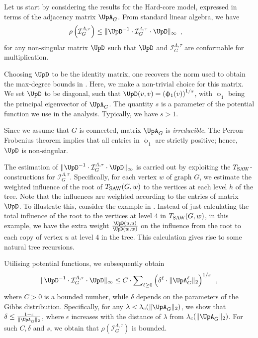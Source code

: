 \documentclass[11pt,reqno]{amsart}
\numberwithin{equation}{section}
\newcommand{\cI}{{\mathcal{I}}}
\newcommand{\applegreen}[1]{ {\color{applegreen}#1}}
\newcommand{\blue}[1]{{\color{blue}#1}}
\newcommand{\cadmiumorange}[1]{{\color{cadmiumorange}#1}}
\newcommand{\darkmagenta}[1]{{\color{darkmagenta}#1}}
\newcommand{\electricviolet}[1]{{\color{electricviolet}#1}}
\newcommand{\goldenbrown}[1]{{\color{goldenbrown}#1}}
\newcommand{\red}[1]{{\color{red}#1}}
\newcommand{\lcritical}{{\lambda_c}}
\newcommand{\pfs}{\darkmagenta{s}}
\newcommand{\Tsaw}{T_{\rm SAW}}
\newcommand{\infmatrix}{\cI}
\newcommand{\spradius}{{\rho}}
\newcommand{\norm}[2]{\goldenbrown{\|} #1 \goldenbrown{\|}_{#2}}
\newcommand{\Adjacency}{{\UpA}}
\newcommand{\eigenv}{\upphi}
\renewcommand{\applegreen}[1]{#1}
\renewcommand{\blue}[1]{#1}
\renewcommand{\cadmiumorange}[1]{#1}
\renewcommand{\darkmagenta}[1]{#1}
\renewcommand{\electricviolet}[1]{#1}
\renewcommand{\goldenbrown}[1]{#1}
\renewcommand{\red}[1]{#1}
\newcommand{\kh}{\cadmiumorange{h}}
\newcommand{\kell}{{\color{green(pigment)}\ell}}%
\newcommand{\ku}{\red{u}}
\newcommand{\kv}{\electricviolet{v}}
\newcommand{\kw}{\blue{w}}
\renewcommand{\kh}{h}
\renewcommand{\kell}{\ell}
\renewcommand{\ku}{u}
\renewcommand{\kv}{v}
\renewcommand{\kw}{w}
\begin{document}
Let us start by considering  the results for the Hard-core model,  expressed in terms of the adjacency matrix $\Adjacency_G$.  
From  standard  linear algebra, we have 
\begin{align*}
\spradius\left( \infmatrix^{\Lambda,\tau}_{G} \right) &\leq \norm{ \UpD^{-1} \cdot \infmatrix^{\Lambda,\tau}_{G} \cdot \UpD }{\infty} \enspace,
\end{align*}
for any non-singular matrix $\UpD$ such that $\UpD$ and $\infmatrix^{\Lambda,\tau}_{G}$ are conformable 
for multiplication. 



Choosing $\UpD$ to be the identity matrix, one recovers the  norm used to obtain the max-degree 
bounds in  \cite{VigodaSpectralInd}. Here, we make a non-trivial choice for this matrix. We set $\UpD$ 
to be diagonal, such that $\UpD(\kv,\kv)=\left( \eigenv_1(\kv)\right)^{1/\pfs}$,  with $\eigenv_1$ being the 
principal eigenvector of $\Adjacency_G$. The quantity $\pfs$ is a parameter of the potential function 
we use in the analysis.  Typically, we have $\pfs>1$. 
 
 
 
Since we assume that $G$ is connected, matrix  $\Adjacency_G$ is {\em irreducible}. 
The Perron-Frobenius theorem implies that all entries in $\eigenv_1$ are strictly positive; 
hence, $\UpD$ is non-singular. 




The estimation of $\norm{\UpD^{-1} \cdot \infmatrix^{\Lambda,\tau}_{G} \cdot \UpD }{\infty}$ is carried 
out by exploiting the $\Tsaw$-constructions for $\infmatrix^{\Lambda,\tau}_{G}$. Specifically, for each 
vertex $\kw$ of  graph $G$, we estimate the weighted influence of the root of $\Tsaw(G,\kw)$ to the 
vertices at each level $\kh$ of the tree. Note that the influences are weighted according to the entries of matrix $\UpD$. 
To illustrate this,  consider the example in  .  Instead of just calculating the total influence of the
root to the vertices at level $4$ in  $\Tsaw(G,\kw)$, in this example, we have the extra weight 
$\frac{\UpD(\ku,\ku)}{\UpD(\kw,\kw)}$ on the  influence from the root to each  copy of vertex $\ku$ at 
level $4$ in the tree. 
%
This calculation gives rise to some  natural tree recursions. 





Utilising potential functions, we subsequently  obtain 
\begin{align}
 \norm{ \UpD^{-1} \cdot \infmatrix^{\Lambda,\tau}_{G} \cdot \UpD }{\infty} \leq C\cdot \sum\nolimits_{\kell\geq 0} 
 \left( \delta^{\kell}\cdot \norm{ \Adjacency^{\kell}_G}{2} \right)^{1/\pfs}\enspace, \nonumber
\end{align}
%
where $C>0$ is a bounded number, while  $\delta$ depends on the parameters of 
the Gibbs distribution. 
Specifically, for any $\lambda<\lcritical(\norm{\Adjacency_G}{2})$, we show that $\delta\leq \frac{1-\epsilon}{\norm{\Adjacency_G}{2}}$, 
where $\epsilon$ increases with the  distance of $\lambda$ from $\lcritical(\norm{\Adjacency_G}{2})$. 
For such $C,\delta$ and $\pfs$,  we  obtain that $\spradius(\infmatrix^{\Lambda,\tau}_{G})$ is bounded. 
\end{document}
